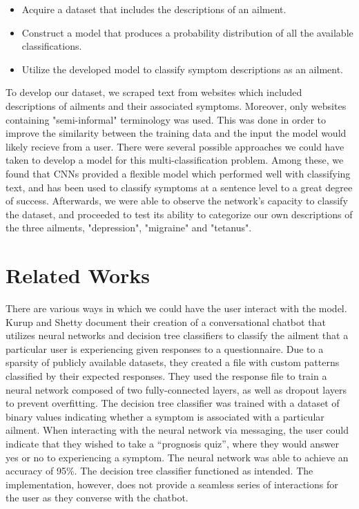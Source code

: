 \documentclass[12pt]{report}
\begin{document}
\begin{itemize}
	\item Acquire a dataset that includes the descriptions of an ailment.
	\item Construct a model that produces a probability distribution of all the available classifications.
	\item Utilize the developed model to classify symptom descriptions as an ailment.
\end{itemize}

To develop our dataset, we scraped text from websites which included
descriptions of ailments and their associated symptoms. Moreover, only websites
containing "semi-informal" terminology was used. This was done in order to
improve the similarity between the training data and the input the model would
likely recieve from a user. There were several possible approaches we could have
taken to develop a model for this multi-classification problem.
Among these, we found that CNNs
provided a flexible model which performed well with classifying text, and has been
used to classify symptoms at a sentence level to a great degree
of success\cite{HughesLKS17}. Afterwards, we were able to observe the network's capacity to classify
the dataset, and proceeded to test its ability to categorize our
own descriptions of the three ailments, "depression", "migraine" and "tetanus".

\chapter{Related Works}
There are various ways in which we could have the user interact with the
model. Kurup and Shetty document their creation of a conversational chatbot
that utilizes neural networks and decision tree classifiers to classify the
ailment that a particular user is experiencing given responses to a
questionnaire. Due to a sparsity of publicly available
datasets, they created a file with custom patterns classified by their
expected responses. They used the response file to train a neural network composed of two
fully-connected layers, as well as dropout layers to prevent overfitting. The decision
tree classifier was trained with a dataset of binary values indicating
whether a symptom is associated with a particular ailment. When
interacting with the neural network via messaging, the user could indicate
that they wished to take a “prognosis quiz”, where they would answer yes or
no to experiencing a symptom. The neural network was able to achieve
an accuracy of 95\%. The decision tree classifier functioned as intended. The
implementation, however, does not provide a seamless series of interactions
for the user as they converse with the chatbot\cite{kurup_2021}.
\end{document}
